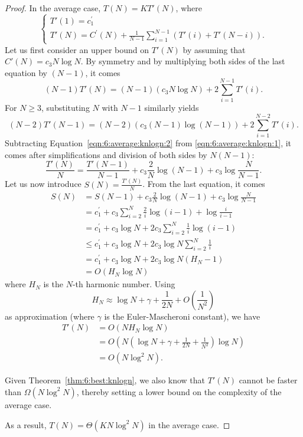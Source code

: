\begin{proof}
In the average case, $T(N) = K T'(N)$, where
\begin{equation}
\begin{cases}
T'(1) = c_1^\prime \\
T'(N) = C^\prime(N) +  \frac{1}{N-1} \sum_{i=1}^{N-1} ( T'(i) + T'(N-i) ).
\end{cases}
\end{equation}
Let us first consider an upper bound on $T'(N)$ by assuming that $C'(N) = c_3 N\log N$.
By symmetry and by multiplying both sides of the last equation by $(N-1)$, it comes
\begin{equation}\label{eqn:6:average:knlogn:1}
(N-1) T'(N) = (N-1)(c_3 N\log N) +  2 \sum_{i=1}^{N-1} T'(i).
\end{equation}
For $N \geq 3$, substituting $N$ with $N-1$ similarly yields
\begin{equation}\label{eqn:6:average:knlogn:2}
(N-2) T'(N-1) = (N-2)(c_3 (N-1) \log(N-1)) +  2 \sum_{i=1}^{N-2} T'(i).
\end{equation}
Subtracting Equation~\ref{eqn:6:average:knlogn:2} from \ref{eqn:6:average:knlogn:1},
it comes after simplifications and division of both sides by $N(N-1)$:
\begin{equation}
\frac{T'(N)}{N} = \frac{T'(N-1)}{N-1} + c_3 \frac{2}{N} \log(N-1) + c_3 \log \frac{N}{N-1}.
\end{equation}
Let us now introduce $S(N) = \frac{T'(N)}{N}$. From the last equation, it comes
\begin{align}
S(N) &= S(N-1) + c_3 \frac{2}{N} \log(N-1) + c_3 \log \frac{N}{N-1} \nonumber \\
     &= c_1^\prime + c_3 \sum_{i=2}^N \frac{2}{i} \log(i-1) + \log \frac{i}{i-1}  \nonumber \\
     &= c_1^\prime + c_3 \log N + 2 c_3 \sum_{i=2}^N \frac{1}{i} \log(i-1)  \nonumber \\
     &\leq c_1^\prime + c_3 \log N + 2 c_3 \log N \sum_{i=2}^N \frac{1}{i}  \nonumber \\
     &= c_1^\prime + c_3 \log N + 2 c_3 \log N (H_N - 1)  \nonumber \\
     &= O(H_N \log N)
\end{align}
where $H_N$ is the $N$-th harmonic number. Using
\begin{equation}
H_N \approx \log N + \gamma + \frac{1}{2N} + O(\frac{1}{N^2})
\end{equation}
as approximation (where $\gamma$ is the Euler-Mascheroni constant), we have
\begin{align*}
T'(N) &= O(N H_N \log N) \nonumber \\
      &= O(N (\log N + \gamma + \frac{1}{2N} + \frac{1}{N^2}) \log N  ) \nonumber \\
      &= O(N \log^2 N).
\end{align*}

Given Theorem~\ref{thm:6:best:knlogn}, we also know that $T'(N)$ cannot be
faster than $\Omega(N \log^2 N)$, thereby setting a lower bound on the complexity
of the average case.

As a result, $T(N) = \Theta(KN\log^2 N)$ in the average case.
\end{proof}

